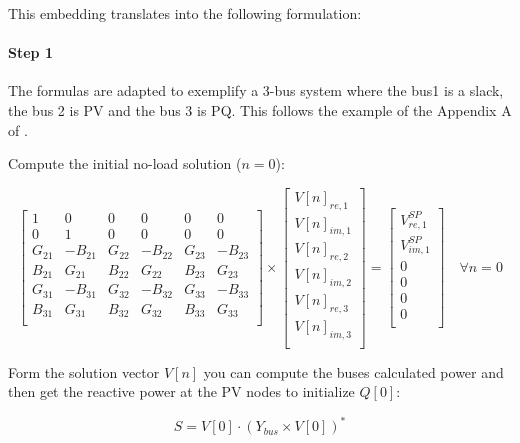 \documentclass[nols,a4paper,twoside,notoc,fleqn]{tufte-book}
\begin{document}
This embedding translates into the following formulation:

\paragraph{Step 1}

The formulas are adapted to exemplify a 3-bus system where the bus1 is a slack, the bus 2 is PV and the bus 3 is PQ. This follows the example of the Appendix A of \cite{liu2017online}.

\vspace{1cm}

Compute the initial no-load solution ($n=0$):

\begin{equation}
\begin{bmatrix}
1 & 0 & 0 & 0 & 0 & 0\\
0 & 1 & 0 & 0 & 0 & 0\\
G_{21} & -B_{21} & G_{22} & -B_{22} & G_{23} & -B_{23}\\
B_{21} & G_{21}  & B_{22} & G_{22}  & B_{23} & G_{23}\\
G_{31} & -B_{31} & G_{32} & -B_{32} & G_{33} & -B_{33}\\
B_{31} & G_{31}  & B_{32} & G_{32}  & B_{33} & G_{33}\\
\end{bmatrix}
\times
\begin{bmatrix}
V[n]_{re, 1}\\
V[n]_{im, 1}\\
V[n]_{re, 2}\\
V[n]_{im, 2}\\
V[n]_{re, 3}\\
V[n]_{im, 3}\\
\end{bmatrix}
=
\begin{bmatrix}
V^{SP}_{re, 1}\\
V^{SP}_{im, 1}\\
0\\
0\\
0\\
0\\
\end{bmatrix}
\quad \forall n = 0
\end{equation}

Form the solution vector ${V}[n]$ you can compute the buses calculated power and then get the reactive power at the PV nodes to initialize ${Q}[0]$:

\begin{equation}
{S} = {V}[0] \cdot ({Y}_{bus} \times {V}[0])^*
\label{Scalc}
\end{equation}
\end{document}
